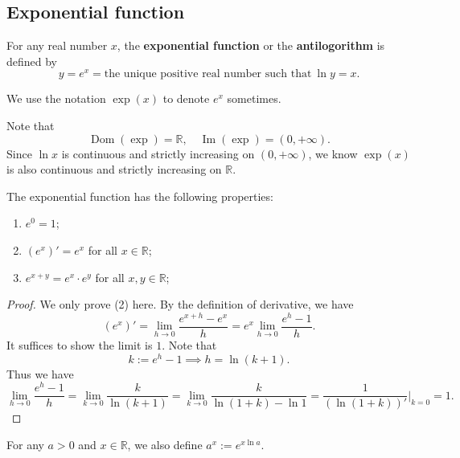 \documentclass[a4paper]{ctexart}
\begin{document}
	\subsection{Exponential function}
	\begin{mydef}
		For any real number $x$, the \textbf{exponential function} or the \textbf{antilogorithm} is defined by
		\[
		y = e^x = \text{the unique positive real number such that}\ \ln y = x.
		\]
	\end{mydef}
	\begin{mynot}
		We use the notation $\exp(x)$ to denote $e^x$ sometimes.
	\end{mynot}
	\begin{myrmk}
		Note that
		\[
		\operatorname{Dom} (\exp) = \mathbb{R}, \quad \operatorname{Im} (\exp) = (0, +\infty).
		\]
		Since $\ln x$ is continuous and strictly increasing on $(0, +\infty)$, we know $\exp(x)$ is also continuous and strictly increasing on $\mathbb{R}$.
	\end{myrmk}
	\begin{mythm}
		The exponential function has the following properties:
		\begin{enumerate}
			\item [(1)] $e^0 = 1$;
			\item [(2)] $(e^x)' = e^x$ for all $x\in \mathbb{R}$;
			\item [(3)] $e^{x+y} = e^x \cdot e^y$ for all $x,y\in \mathbb{R}$;
		\end{enumerate}
	\end{mythm}
	\begin{proof}
		We only prove (2) here. By the definition of derivative, we have
		\[
		(e^x)' = \lim_{h\to 0} \frac{e^{x+h} - e^x}{h} = e^x \lim_{h\to 0} \frac{e^h - 1}{h}.
		\]
		It suffices to show the limit is $1$. Note that
		\[
		k := e^h - 1 \implies h = \ln (k+1).
		\]
		Thus we have
		\[
		\lim_{h\to 0} \frac{e^h - 1}{h} = \lim_{k\to 0} \frac{k}{\ln (k+1)} = \lim_{k\to 0} \frac{k}{\ln (1+k) - \ln 1} = \frac{1}{\left( \ln (1+k) \right)'}\Big|_{k=0} = 1.
		\]
	\end{proof}
	\begin{mydef}
		For any $a>0$ and $x\in \mathbb{R}$, we also define $a^x := e^{x \ln a}$.
	\end{mydef}
\end{document}
